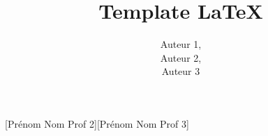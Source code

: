 \documentclass[french,nochapter,11pt]{TP}
\author{
    Auteur 1,\\
    Auteur 2,\\
    Auteur 3
}
\title{Template \LaTeX}
\begin{document}
[Prénom Nom Prof 2][Prénom Nom Prof 3]
\end{document}

